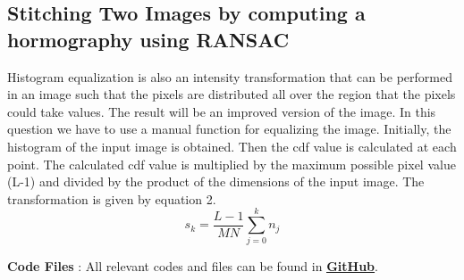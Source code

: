\documentclass[11pt]{article}
\begin{document}
\begin{flushleft}
\section{Stitching Two Images by computing a hormography using RANSAC }
Histogram equalization is also an intensity transformation that can be performed in an image such that the pixels are distributed all over the region that the pixels could take values. The result will be an improved version of the image. In this question we have to use a manual function for equalizing the image. Initially, the histogram of the input image is obtained. Then the cdf value is calculated at each point. The calculated cdf value is multiplied by the maximum possible pixel value (L-1) and divided by the product of the dimensions of the input image. The transformation is given by equation 2. 
\begin{equation}\label{Equation 2: Histogram Equalization}
    s_k = \frac{L-1}{MN}\sum_{j=0}^{k} n_j
\end{equation}

\textbf{Code Files} : All relevant codes and files can be found in \href{https://github.com/K-Thanushan/EN2550-Fundamentals-of-Image-Processing-and-Machine-Vision/tree/main/Assignments/Assignment1}{\textbf{\underline{GitHub}}}.

\end{flushleft}
\end{document}
